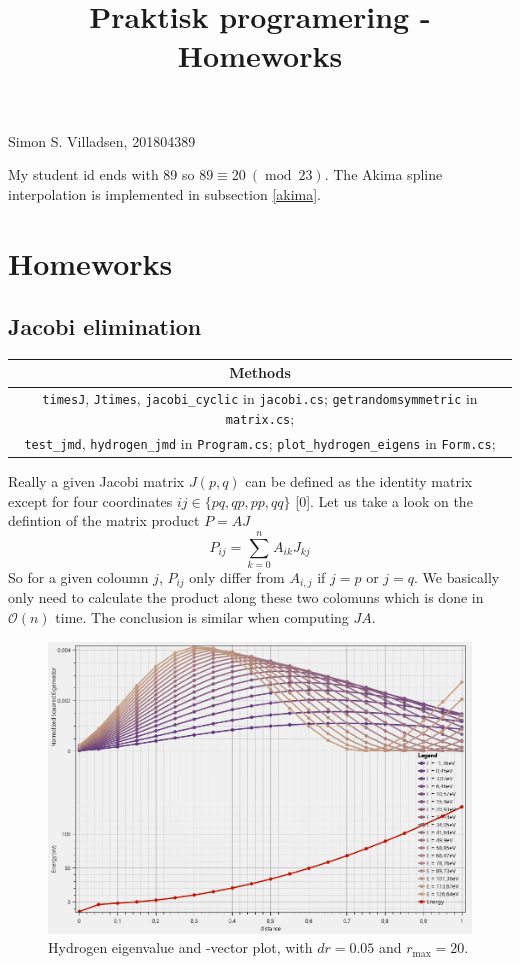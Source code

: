 \documentclass{article}
\title{Praktisk programering - Homeworks}
\begin{document}
\maketitle
\begin{center}
	Simon S. Villadsen, 201804389\
\end{center}
	My student id ends with 89 so $89 \equiv 20\  (\operatorname{mod}\ 23)$. The Akima spline interpolation is implemented in subsection \ref{akima}.
\section{Homeworks}
\subsection{Jacobi elimination}
\begin{table}[H]\centering
	\begin{tabular}{|c|}
		\hline
		Methods\\\hline
		\texttt{timesJ}, \texttt{Jtimes}, \texttt{jacobi\_cyclic} in \texttt{jacobi.cs};
		 \texttt{getrandomsymmetric} in \texttt{matrix.cs};\\
		  \texttt{test\_jmd}, \texttt{hydrogen\_jmd} in \texttt{Program.cs};
		   \texttt{plot\_hydrogen\_eigens} in \texttt{Form.cs}; \\
		\hline
	\end{tabular}
\end{table}
Really a given Jacobi matrix $J(p, q)$ can be defined as the identity matrix except for four coordinates $ij\in \{pq, qp, pp, qq\}$ [0]. Let us take a look on the defintion of the matrix product $P=AJ$
\begin{equation}
	P_{ij} = \sum _{k= 0}^n A_{ik}J_{kj}
\end{equation}
So for a given coloumn $j$, $P_{ij}$ only differ from $A_{i, j}$ if $j = p$ or $j = q$. We basically only need to calculate the product along these two colomuns which is done in $\mathcal{O}(n)$ time. The conclusion is similar when computing $JA$. 
\begin{figure}[H]
	\centering
	\includegraphics[width=.62\textwidth]{hydrogen_plot.png}
	\caption{Hydrogen eigenvalue and -vector plot, with $dr = 0.05$ and $r_{\mathrm{max}} = 20$.}
\end{figure}
\end{document}
